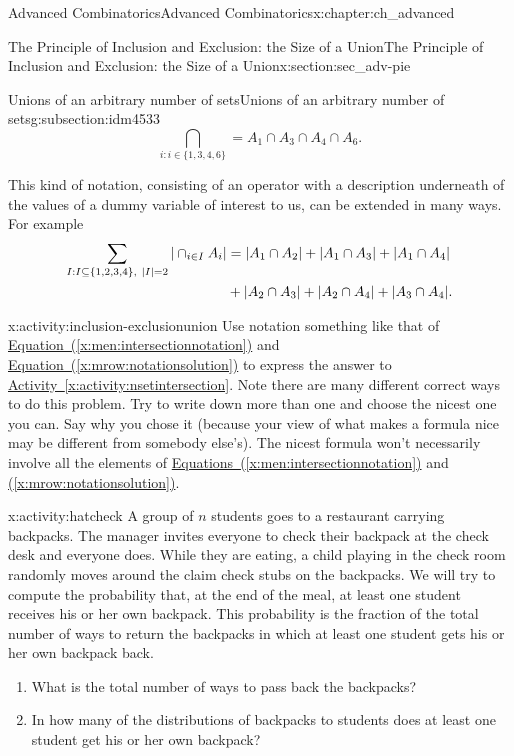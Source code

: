 \documentclass[oneside,10pt,]{book}
\numberwithin{equation}{chapter}
\newcommand{\amp}{&}
\begin{document}
\begin{chapterptx}{Advanced Combinatorics}{}{Advanced Combinatorics}{}{}{x:chapter:ch_advanced}
\begin{sectionptx}{The Principle of Inclusion and Exclusion: the Size of a Union}{}{The Principle of Inclusion and Exclusion: the Size of a Union}{}{}{x:section:sec_adv-pie}
\begin{subsectionptx}{Unions of an arbitrary number of sets}{}{Unions of an arbitrary number of sets}{}{}{g:subsection:idm4533}
\begin{equation}
\bigcap_{i:i\in
\{1,3,4,6\}} = A_1\cap A_3\cap A_4 \cap A_6.\label{x:men:intersectionnotation}
\end{equation}
%
\par
This kind of notation, consisting of an operator with a description underneath of the values of a dummy variable of interest to us, can be extended in many ways. For example%
\begin{align}
\sum_{I:I \subseteq \{1,2,3,4\}, \ |I|=2} |\cap_{i\in I}
A_i|  \amp =  |A_1\cap A_2|+ |A_1\cap A_3|
+|A_1\cap A_4|\notag\\
\amp +  |A_2\cap A_3|+
|A_2\cap A_4| +|A_3\cap A_4|.\label{x:mrow:notationsolution}
\end{align}
%
\begin{activity}{}{x:activity:inclusion-exclusionunion}%
Use notation something like that of \hyperref[x:men:intersectionnotation]{Equation~(\ref{x:men:intersectionnotation})} and \hyperref[x:mrow:notationsolution]{Equation~(\ref{x:mrow:notationsolution})} to express the answer to \hyperref[x:activity:nsetintersection]{Activity~\ref{x:activity:nsetintersection}}. Note there are many different correct ways to do this problem. Try to write down more than one and choose the nicest one you can. Say why you chose it (because your view of what makes a formula nice may be different from somebody else's). The nicest formula won't necessarily involve all the elements of \hyperref[x:men:intersectionnotation]{Equations~(\ref{x:men:intersectionnotation})} and \hyperref[x:mrow:notationsolution]{(\ref{x:mrow:notationsolution})}.%
\end{activity}
\begin{activity}{}{x:activity:hatcheck}%
A group of \(n\) students goes to a restaurant carrying backpacks. The manager invites everyone to check their backpack at the check desk and everyone does. While they are eating, a child playing in the check room randomly moves around the claim check stubs on the backpacks. We will try to compute the probability that, at the end of the meal, at least one student receives his or her own backpack.  This probability is the fraction of the total number of ways to return the backpacks in which at least one student gets his or her own backpack back.%
\begin{enumerate}[font=\bfseries,label=(\alph*),ref=\alph*]
\item{}What is the total number of ways to pass back the backpacks?%
\item{}In how many of the distributions of backpacks to students does at least one student get his or her own backpack?%

\end{enumerate}
\end{activity}
\end{subsectionptx}
\end{sectionptx}
\end{chapterptx}
\end{document}

